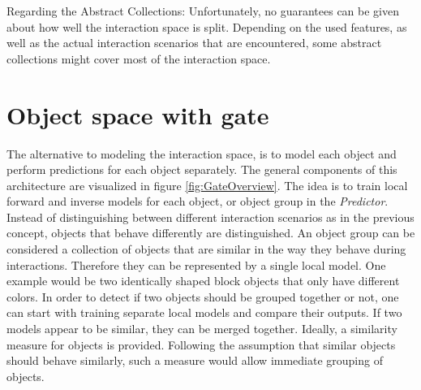 Regarding the Abstract Collections:
Unfortunately, no guarantees can be given about how well the interaction space is split. Depending on the used features, as well as the actual interaction scenarios that are encountered, some abstract collections might cover most of the interaction space. 


\section{Object space with gate \label{sec:gate}}

The alternative to modeling the interaction space, is to model each object and perform predictions for each object separately. 
The general components of this architecture are visualized in figure \ref{fig:GateOverview}.
The idea is to train local forward and inverse models for each object, or object group in the \textit{Predictor}. %
Instead of distinguishing between different interaction scenarios as in the previous concept, objects that behave differently are distinguished. 
An object group can be considered a collection of objects that are similar in the way they behave during interactions. Therefore they can be represented by a single local model. One example would be two identically shaped block objects that only have different colors. In order to detect if two objects should be grouped together or not, one can start with training separate local models and compare their outputs. If two models appear to be similar, they can be merged together. Ideally, a similarity measure for objects is provided. Following the assumption that similar objects should behave similarly, such a measure would allow immediate grouping of objects.

